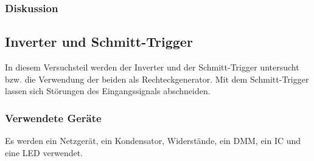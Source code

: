 \documentclass[12pt,a4paper]{article}
\begin{document}
\subsubsection*{Diskussion}





\subsection{Inverter und Schmitt-Trigger}

In diesem Versuchsteil werden der Inverter und der Schmitt-Trigger untersucht bzw. die Verwendung der beiden als Rechteckgenerator. Mit dem Schmitt-Trigger lassen sich Störungen des Eingangssignals abschneiden.

\subsubsection*{Verwendete Geräte}

Es werden ein Netzgerät, ein Kondensator, Widerstände, ein DMM, ein IC und eine LED verwendet.
\end{document}

